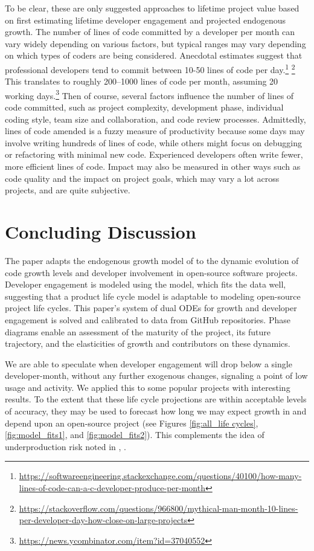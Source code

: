 \documentclass[conference]{IEEEtran}
\begin{document}
To be clear, these are only suggested approaches to lifetime project value based on first estimating lifetime developer engagement and projected endogenous growth. The number of lines of code committed by a developer per month can vary widely depending on various factors, but typical ranges may vary depending on which types of coders are being considered. Anecdotal estimates suggest that professional developers tend to commit between 10-50 lines of code per day.\footnote{\url{https://softwareengineering.stackexchange.com/questions/40100/how-many-lines-of-code-can-a-c-developer-produce-per-month}} \footnote{ \url{https://stackoverflow.com/questions/966800/mythical-man-month-10-lines-per-developer-day-how-close-on-large-projects}} This translates to roughly 200--1000 lines of code per month, assuming 20 working days.\footnote{\url{https://news.ycombinator.com/item?id=37040552}} Then of course, several factors influence the number of lines of code committed, such as project complexity, development phase, individual coding style, team size and collaboration, and code review processes. Admittedly, lines of code amended is a fuzzy measure of productivity because some days may involve writing hundreds of lines of code, while others might focus on debugging or refactoring with minimal new code. Experienced developers often write fewer, more efficient lines of code. Impact may also be measured in other ways such as code quality and the impact on project goals, which may vary a lot across projects, and are quite subjective. 


 
\section{Concluding Discussion}
\label{sec:conclusions}

The paper adapts the endogenous growth model of \cite{romer_endogenous_1990} to the dynamic evolution of code growth levels and developer involvement in open-source software projects. Developer engagement is modeled using the \cite{bass_new_1969} model, which fits the data well, suggesting that a product life cycle model is adaptable to modeling open-source project life cycles. This paper's  system of dual ODEs for growth and developer engagement is solved and calibrated to data from GitHub repositories. Phase diagrams enable an assessment of the maturity of the project, its future trajectory, and the elasticities of growth and contributors on these dynamics. 

We are able to speculate when developer engagement will drop below a single developer-month, without any further exogenous changes, signaling a point of low usage and activity.  We applied this to some popular projects with interesting results. To the extent that these life cycle projections are within acceptable levels of accuracy, they may be used to forecast how long we may expect growth in and depend upon  an open-source project (see Figures \ref{fig:all_life cycles}, \ref{fig:model_fits1}, and \ref{fig:model_fits2}). This complements the idea of underproduction risk noted in \cite{champion_underproduction_2021}, \cite{gaughan_engineering_2024}.
\end{document}
